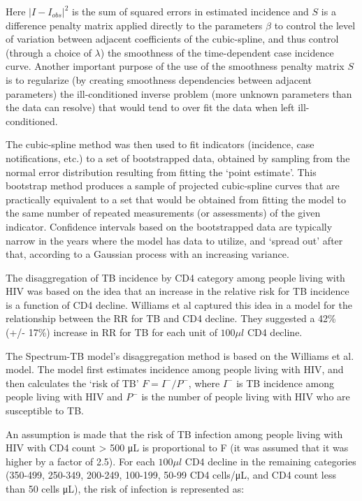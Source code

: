 Here $|I - I_{obs}|^2$  is the sum of squared errors in estimated incidence and $S$ is a difference penalty matrix applied directly to the parameters $\beta$ to control the level of variation between adjacent coefficients of the cubic-spline, and thus control (through a choice of $\lambda$) the smoothness of the time-dependent case incidence curve. Another important purpose of the use of the smoothness penalty matrix $S$ is to regularize (by creating smoothness dependencies between adjacent parameters) the ill-conditioned inverse problem (more unknown parameters than the data can resolve) that would tend to over fit the data when left ill-conditioned.

The cubic-spline method was then used to fit indicators (incidence, case notifications, etc.) to a set of bootstrapped data, obtained by sampling from the normal error distribution resulting from fitting the ‘point estimate’. This bootstrap method produces a sample of projected cubic-spline curves that are practically equivalent to a set that would be obtained from fitting the model to the same number of repeated measurements (or assessments) of the given indicator. Confidence intervals based on the bootstrapped data are typically narrow in the years where the model has data to utilize, and ‘spread out’ after that, according to a Gaussian process with an increasing variance.

The disaggregation of TB incidence by CD4 category among people living with HIV was based on the idea that an increase in the relative risk for TB incidence is a function of CD4 decline. Williams et al captured this idea in a model for the relationship between the RR for TB and CD4 decline.\cite{20974976} They suggested a 42\% (+/- 17\%) increase in RR for TB for each unit of $100\mu l$ CD4 decline.

The Spectrum-TB model’s disaggregation method is based on the Williams et al. model. The model first estimates incidence among people living with HIV, and then calculates the ‘risk of TB’ $F=I^- / P^-$, where $I^-$ is TB incidence among people living with HIV and $P^-$ is the number of people living with HIV who are susceptible to TB.

An assumption is made that the risk of TB infection among people living with HIV with CD4 count > 500 μL is proportional to F (it was assumed that it was higher by a factor of 2.5).\cite{15609223} For each $100\mu l$ CD4 decline in the remaining categories (350-499, 250-349, 200-249, 100-199, 50-99 CD4 cells/μL, and CD4 count less than 50 cells μL), the risk of infection is represented as:

